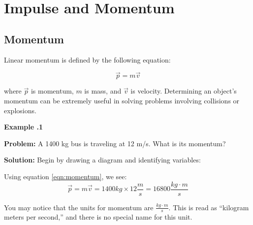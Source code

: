 \chapter{Impulse and Momentum}
	\section{Momentum} \label{momentum}  
	Linear \gls{momentum} is defined by the following equation:
	\begin{mdframed}[backgroundcolor=orange!20!white]
		\begin{equation}
		\vec{p} = m \vec{v} 
		\label{eqn:momentum}
		\end{equation}
	\end{mdframed}
	 where $\vec{p}$ is momentum, $m$ is mass, and $\vec{v} $ is velocity.  Determining an object's momentum can be extremely useful in solving problems involving collisions or explosions.  
	 
	 \begin{mdframed}[backgroundcolor=blue!10!white]
	 	\begin{center}
	 		
	 		
	 		\textbf{Example \thesection.1}	
	 	\end{center}
	 	
	 	\textbf{Problem: } A 1400 kg bus is traveling at 12 m/s.  What is its momentum? 
	 	\vspace{0.1in}
	 	
	 	\textbf{Solution:} 
	 	Begin by drawing a diagram and identifying variables:
	 		 \vspace{0.2in}
	 	
	 	
	 	Using equation \ref{eqn:momentum}, we see:
	 	\begin{equation*}
	 	\vec{p} = m \vec{v} = 1400 kg \times 12 \frac{m}{s} = \boxed{16800 \frac{kg\cdot m}{s}}
	 	\end{equation*}
	 	
	 \end{mdframed}
	 \vspace{0.1in}
	 You may notice that the units for momentum are $\frac{kg \cdot m} {s}$.  This is read as ``kilogram meters per second,'' and there is no special name for this unit.  
	 
